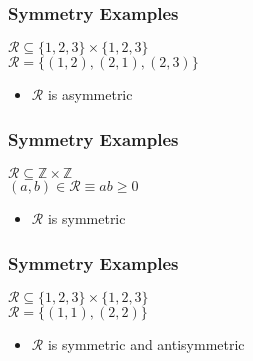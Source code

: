 \documentclass[dvipsnames]{beamer}
\begin{document}
\begin{frame}
  \frametitle{Symmetry Examples}

  \begin{example}
    $\mathcal{R} \subseteq \{1,2,3\} \times \{1,2,3\}$\\
    $\mathcal{R} = \{(1,2), (2,1), (2,3)\}$

    \medskip
    \begin{itemize}
      \item $\mathcal{R}$ is asymmetric
    \end{itemize}
  \end{example}
\end{frame}

\begin{frame}
  \frametitle{Symmetry Examples}

  \begin{example}
    $\mathcal{R} \subseteq \mathbb{Z} \times \mathbb{Z}$\\
    $(a,b) \in \mathcal{R} \equiv ab \geq 0$

    \medskip
    \begin{itemize}
      \item $\mathcal{R}$ is symmetric
    \end{itemize}
  \end{example}
\end{frame}

\begin{frame}
  \frametitle{Symmetry Examples}

  \begin{example}
    $\mathcal{R} \subseteq \{1,2,3\} \times \{1,2,3\}$\\
    $\mathcal{R} = \{(1,1), (2,2)\}$

    \begin{itemize}
      \item $\mathcal{R}$ is symmetric and antisymmetric
    \end{itemize}
  \end{example}
\end{frame}
\end{document}
